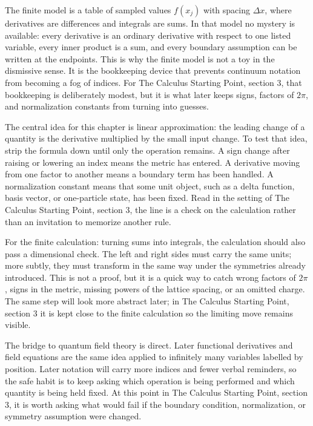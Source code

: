 The finite model is a table of sampled values \(f(x_j)\) with spacing \(\Delta x\), where derivatives are differences and integrals are sums.  In that model no mystery is available: every derivative is an ordinary derivative with respect to one listed variable, every inner product is a sum, and every boundary assumption can be written at the endpoints.  This is why the finite model is not a toy in the dismissive sense.  It is the bookkeeping device that prevents continuum notation from becoming a fog of indices.  For The Calculus Starting Point, section 3, that bookkeeping is deliberately modest, but it is what later keeps signs, factors of \(2\pi\), and normalization constants from turning into guesses.

The central idea for this chapter is linear approximation: the leading change of a quantity is the derivative multiplied by the small input change.  To test that idea, strip the formula down until only the operation remains.  A sign change after raising or lowering an index means the metric has entered.  A derivative moving from one factor to another means a boundary term has been handled.  A normalization constant means that some unit object, such as a delta function, basis vector, or one-particle state, has been fixed.  Read in the setting of The Calculus Starting Point, section 3, the line is a check on the calculation rather than an invitation to memorize another rule.

For the finite calculation: turning sums into integrals, the calculation should also pass a dimensional check.  The left and right sides must carry the same units; more subtly, they must transform in the same way under the symmetries already introduced.  This is not a proof, but it is a quick way to catch wrong factors of \(2\pi\), signs in the metric, missing powers of the lattice spacing, or an omitted charge.  The same step will look more abstract later; in The Calculus Starting Point, section 3 it is kept close to the finite calculation so the limiting move remains visible.

The bridge to quantum field theory is direct.  Later functional derivatives and field equations are the same idea applied to infinitely many variables labelled by position.  Later notation will carry more indices and fewer verbal reminders, so the safe habit is to keep asking which operation is being performed and which quantity is being held fixed.  At this point in The Calculus Starting Point, section 3, it is worth asking what would fail if the boundary condition, normalization, or symmetry assumption were changed.

